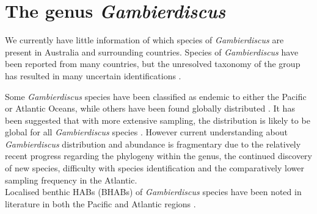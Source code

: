 \documentclass[12pt]{article}
\begin{document}
\section{The genus \emph{Gambierdiscus}}
We currently have little information of which species of \emph{Gambierdiscus} are present in Australia and surrounding countries. Species of \emph{Gambierdiscus} have been reported from many countries, but the unresolved taxonomy of the group has resulted in many uncertain identifications \cite{marine2014}.

Some \emph{Gambierdiscus} species have been classified as endemic to either the Pacific or Atlantic Oceans, while others have been found globally distributed \cite{berdalet2012global,litaker2010global}. It has been suggested that with more extensive sampling, the distribution is likely to be global for all \emph{Gambierdiscus} species \cite{testerICHA}. However current understanding about \emph{Gambierdiscus} distribution and abundance is fragmentary due to the relatively recent progress regarding the phylogeny within the genus, the continued discovery of new species, difficulty with species identification and the comparatively lower sampling frequency in the Atlantic. \\
Localised benthic HABs (BHABs) of \emph{Gambierdiscus} species have been noted in literature in both the Pacific and Atlantic regions \cite{nakajima1981toxicity,withers1984ciguatera,chinain1999seasonal,darius2007ciguatera}.

\end{document}
